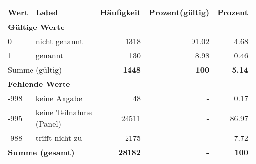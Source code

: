      \begin{longtable}{lXrrr}
     \toprule
     \textbf{Wert} & \textbf{Label} & \textbf{Häufigkeit} & \textbf{Prozent(gültig)} & \textbf{Prozent} \\
     \endhead
     \midrule
     \multicolumn{5}{l}{\textbf{Gültige Werte}}\\

     0 &
     \multicolumn{1}{X}{ nicht genannt   } &


       \num{1318} &
       \num[round-mode=places,round-precision=2]{91.02} &
         \num[round-mode=places,round-precision=2]{4.68} \\

     1 &
     \multicolumn{1}{X}{ genannt   } &


       \num{130} &
       \num[round-mode=places,round-precision=2]{8.98} &
         \num[round-mode=places,round-precision=2]{0.46} \\
     \midrule
     \multicolumn{2}{l}{Summe (gültig)} &
       \textbf{\num{1448}} &
     \textbf{100} &
       \textbf{\num[round-mode=places,round-precision=2]{5.14}} \\
     \multicolumn{5}{l}{\textbf{Fehlende Werte}}\\
       -998 &
       keine Angabe &
         \num{48} &
        - &
         \num[round-mode=places,round-precision=2]{0.17} \\
       -995 &
       keine Teilnahme (Panel) &
         \num{24511} &
        - &
         \num[round-mode=places,round-precision=2]{86.97} \\
       -988 &
       trifft nicht zu &
         \num{2175} &
        - &
         \num[round-mode=places,round-precision=2]{7.72} \\
     \midrule
     \multicolumn{2}{l}{\textbf{Summe (gesamt)}} &
          \textbf{\num{28182}} &
        \textbf{-} &
        \textbf{100} \\
     \bottomrule
     \end{longtable}
     
